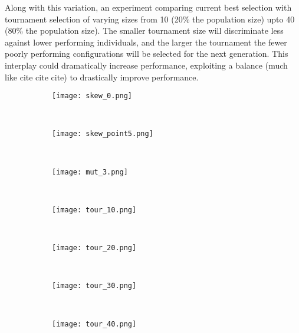 Along with this variation, an experiment comparing current best
selection with tournament selection of varying sizes from 10 (20\% the population
size) upto 40 (80\% the population size). The smaller tournament size
will discriminate less against lower performing individuals, and the
larger the tournament the fewer poorly performing configurations will
be selected for the next generation. This interplay could dramatically
increase performance, exploiting a balance (\todo much like cite cite cite)
to drastically improve performance.

\begin{figure}
	\begin{minipage}{\textwidth}
	\centering
	\begin{subfigure}[ht]{0.32\textwidth}
		\texttt{[image: skew\_0.png]}
		\caption{}
		\label{fig:skew_0}
		\vspace{1em}
	\end{subfigure}
	~
	\begin{subfigure}[ht]{0.32\textwidth}
		\texttt{[image: skew\_point5.png]}
		\caption{}
		\label{fig:skew_point5}
		\vspace{1em}
	\end{subfigure}
	~
	\begin{subfigure}[ht]{0.32\textwidth}
		\texttt{[image: mut\_3.png]}
		\caption{}
		\label{fig:skew_1}
		\vspace{1em}
	\end{subfigure}
	~
	\begin{subfigure}[ht]{0.49\textwidth}
		\texttt{[image: tour\_10.png]}
		\caption{}
		\label{fig:tour_10}
		\vspace{1em}
	\end{subfigure}
	~
	\begin{subfigure}[ht]{0.49\textwidth}
		\texttt{[image: tour\_20.png]}
		\caption{}
		\label{fig:tour_20}
		\vspace{1em}
	\end{subfigure}
	~
	\begin{subfigure}[ht]{0.49\textwidth}
		\texttt{[image: tour\_30.png]}
		\caption{}
		\label{fig:tour_30}
		\vspace{1em}
	\end{subfigure}
	~
	\begin{subfigure}[ht]{0.49\textwidth}
		\texttt{[image: tour\_40.png]}
		\caption{}
		\label{fig:tour_40}
		\vspace{1em}

\end{subfigure}
\end{minipage}
\end{figure}
